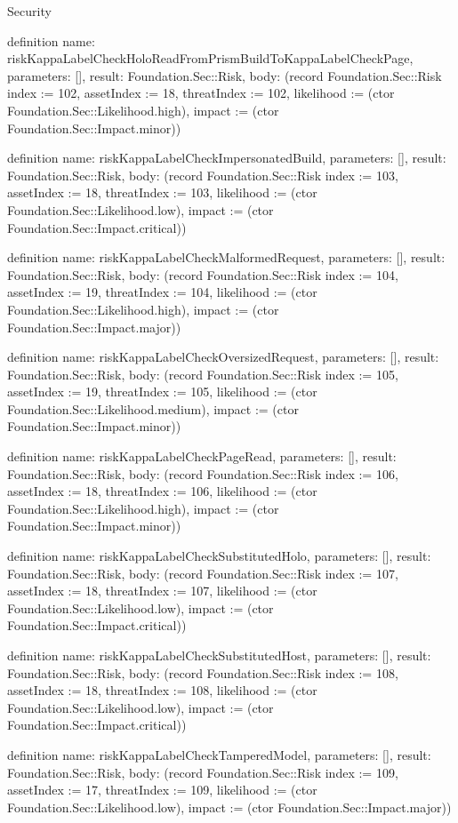 \begin{lexlean}{Security}
\begin{semanticmodule}
definition{
  name: riskKappaLabelCheckHoloReadFromPrismBuildToKappaLabelCheckPage,
  parameters: [],
  result: Foundation.Sec::Risk,
  body: (record Foundation.Sec::Risk {index := 102, assetIndex := 18, threatIndex := 102, likelihood := (ctor Foundation.Sec::Likelihood.high), impact := (ctor Foundation.Sec::Impact.minor)})
}

definition{
  name: riskKappaLabelCheckImpersonatedBuild,
  parameters: [],
  result: Foundation.Sec::Risk,
  body: (record Foundation.Sec::Risk {index := 103, assetIndex := 18, threatIndex := 103, likelihood := (ctor Foundation.Sec::Likelihood.low), impact := (ctor Foundation.Sec::Impact.critical)})
}

definition{
  name: riskKappaLabelCheckMalformedRequest,
  parameters: [],
  result: Foundation.Sec::Risk,
  body: (record Foundation.Sec::Risk {index := 104, assetIndex := 19, threatIndex := 104, likelihood := (ctor Foundation.Sec::Likelihood.high), impact := (ctor Foundation.Sec::Impact.major)})
}

definition{
  name: riskKappaLabelCheckOversizedRequest,
  parameters: [],
  result: Foundation.Sec::Risk,
  body: (record Foundation.Sec::Risk {index := 105, assetIndex := 19, threatIndex := 105, likelihood := (ctor Foundation.Sec::Likelihood.medium), impact := (ctor Foundation.Sec::Impact.minor)})
}

definition{
  name: riskKappaLabelCheckPageRead,
  parameters: [],
  result: Foundation.Sec::Risk,
  body: (record Foundation.Sec::Risk {index := 106, assetIndex := 18, threatIndex := 106, likelihood := (ctor Foundation.Sec::Likelihood.high), impact := (ctor Foundation.Sec::Impact.minor)})
}

definition{
  name: riskKappaLabelCheckSubstitutedHolo,
  parameters: [],
  result: Foundation.Sec::Risk,
  body: (record Foundation.Sec::Risk {index := 107, assetIndex := 18, threatIndex := 107, likelihood := (ctor Foundation.Sec::Likelihood.low), impact := (ctor Foundation.Sec::Impact.critical)})
}

definition{
  name: riskKappaLabelCheckSubstitutedHost,
  parameters: [],
  result: Foundation.Sec::Risk,
  body: (record Foundation.Sec::Risk {index := 108, assetIndex := 18, threatIndex := 108, likelihood := (ctor Foundation.Sec::Likelihood.low), impact := (ctor Foundation.Sec::Impact.critical)})
}

definition{
  name: riskKappaLabelCheckTamperedModel,
  parameters: [],
  result: Foundation.Sec::Risk,
  body: (record Foundation.Sec::Risk {index := 109, assetIndex := 17, threatIndex := 109, likelihood := (ctor Foundation.Sec::Likelihood.low), impact := (ctor Foundation.Sec::Impact.major)})
}


\end{semanticmodule}
\end{lexlean}
